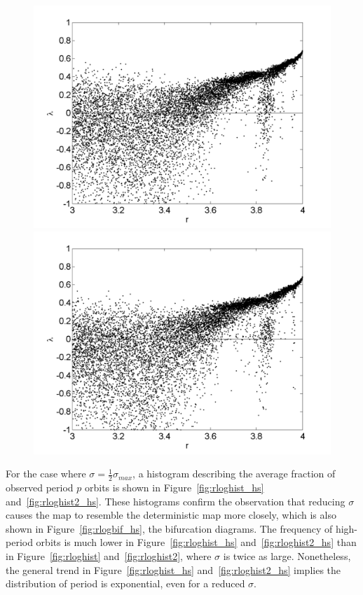 \begin{figure}[!h]
\includegraphics[width=.5\textwidth]{figs/rlog_lyap_halfsig_L_08.png}\hfill
\includegraphics[width=.5\textwidth]{figs/rlog_lyap_halfsig_L_09.png}\\
\end{figure}

For the case where $\sigma = \frac{1}{2}\sigma_{max}$, a histogram describing the average fraction of observed period $p$
orbits is shown in Figure~\ref{fig:rloghist_hs}
and~\ref{fig:rloghist2_hs}. These histograms confirm the observation
that reducing $\sigma$ causes the map to resemble the deterministic
map more closely, which is also shown in Figure~\ref{fig:rlogbif_hs},
the bifurcation diagrams. The frequency of high-period orbits is much
lower in Figure~\ref{fig:rloghist_hs} and~\ref{fig:rloghist2_hs} than
in Figure~\ref{fig:rloghist} and~\ref{fig:rloghist2}, where
$\sigma$ is twice as large. Nonetheless, the general trend in Figure~\ref{fig:rloghist_hs}
and~\ref{fig:rloghist2_hs} implies the distribution of period is
exponential, even for a reduced $\sigma$.

